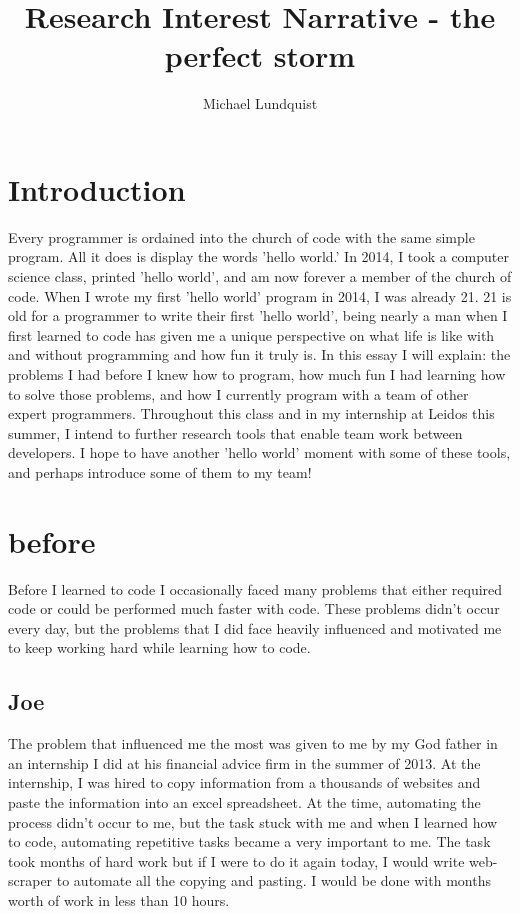 \documentclass[titlepage]{article}
\author{Michael Lundquist}
\title{Research Interest Narrative - the perfect storm}
\begin{document}
\maketitle


\section{Introduction}

Every programmer is ordained into the church of code with the same simple program. All it does is display the words 'hello world.' In 2014, I took a computer science class, printed 'hello world', and am now forever a member of the church of code. When I wrote my first 'hello world' program in 2014, I was already 21. 21 is old for a programmer to write their first 'hello world', being nearly a man when I first learned to code has given me a unique perspective on what life is like with and without programming and how fun it truly is. In this essay I will explain: the problems I had before I knew how to program, how much fun I had learning how to solve those problems, and how I currently program with a team of other expert programmers. Throughout this class and in my internship at Leidos this summer, I intend to further research tools that enable team work between developers. I hope to have another 'hello world' moment with some of these tools, and perhaps introduce some of them to my team!

\section{before}

Before I learned to code I occasionally faced many problems that either required code or could be performed much faster with code. These problems didn't occur every day, but the problems that I did face heavily influenced and motivated me to keep working hard while learning how to code.

\subsection{Joe}

The problem that influenced me the most was given to me by my God father in an internship I did at his financial advice firm in the summer of 2013. At the internship, I was hired to copy information from a thousands of websites and paste the information into an excel spreadsheet. At the time, automating the process didn't occur to me, but the task stuck with me and when I learned how to code, automating repetitive tasks became a very important to me. The task took months of hard work but if I were to do it again today, I would write web-scraper to automate all the copying and pasting. I would be done with months worth of work in less than 10 hours.
\end{document}
